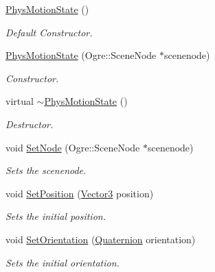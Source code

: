 \begin{DoxyCompactItemize}
\item 
\hyperlink{classphys_1_1internal_1_1PhysMotionState_a64d423e8d2ccec0c7acce7701c898dd0}{PhysMotionState} ()
\begin{DoxyCompactList}\small\item\em Default Constructor. \item\end{DoxyCompactList}\item 
\hyperlink{classphys_1_1internal_1_1PhysMotionState_a604ffb6d4d121ec548d780a515f77dc6}{PhysMotionState} (Ogre::SceneNode $\ast$scenenode)
\begin{DoxyCompactList}\small\item\em Constructor. \item\end{DoxyCompactList}\item 
virtual \hyperlink{classphys_1_1internal_1_1PhysMotionState_a46f94854cc2d758a2adae412dea6def7}{$\sim$PhysMotionState} ()
\begin{DoxyCompactList}\small\item\em Destructor. \item\end{DoxyCompactList}\item 
void \hyperlink{classphys_1_1internal_1_1PhysMotionState_a22ca36a454168e74f73d297c9747d86a}{SetNode} (Ogre::SceneNode $\ast$scenenode)
\begin{DoxyCompactList}\small\item\em Sets the scenenode. \item\end{DoxyCompactList}\item 
void \hyperlink{classphys_1_1internal_1_1PhysMotionState_ad5c5142565ce4b5cd52d2f377ce4da10}{SetPosition} (\hyperlink{classphys_1_1Vector3}{Vector3} position)
\begin{DoxyCompactList}\small\item\em Sets the initial position. \item\end{DoxyCompactList}\item 
void \hyperlink{classphys_1_1internal_1_1PhysMotionState_a5beba7c161a09b90b5a301585a509be6}{SetOrientation} (\hyperlink{classphys_1_1Quaternion}{Quaternion} orientation)
\begin{DoxyCompactList}\small\item\em Sets the initial orientation. \item\end{DoxyCompactList}\item 

\end{DoxyCompactItemize}
